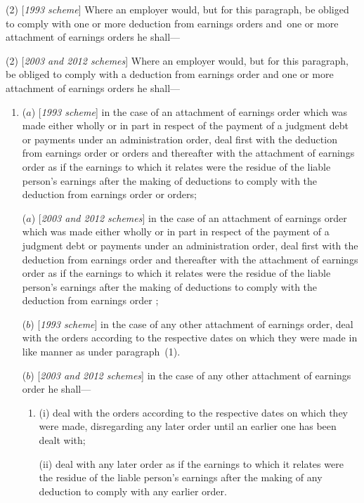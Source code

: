 \documentclass[12pt,a4paper]{article}
\begin{document}
(2) [\emph{1993 scheme}] Where an employer would, but for this paragraph, be obliged to comply with one or more deduction from earnings orders and~one or more attachment of earnings orders he shall—

(2) [\emph{2003 and 2012 schemes}] Where an employer would, but for this paragraph, be obliged to comply with 
a deduction from earnings order  %
and one or more attachment of earnings orders he shall—
\begin{enumerate}\item[]
($a$) [\emph{1993 scheme}] in the case of an attachment of earnings order which was made either wholly or in part in respect of the payment of a judgment debt or payments under an administration order, deal first with the deduction from earnings order or orders and thereafter with the attachment of earnings order as if the earnings to which it relates were the residue of the liable person’s earnings after the making of deductions to comply with the deduction from earnings order or orders;

($a$) [\emph{2003 and 2012 schemes}] in the case of an attachment of earnings order which was made either wholly or in part in respect of the payment of a judgment debt or payments under an administration order, deal first with the deduction from earnings order
and thereafter with the attachment of earnings order as if the earnings to which it relates were the residue of the liable person’s earnings after the making of deductions to comply with the deduction from earnings order%
;

($b$) [\emph{1993 scheme}] in the case of any other attachment of earnings order, deal with the orders according to the respective dates on which they were made in like manner as under paragraph~(1).

($b$) [\emph{2003 and 2012 schemes}] in the case of any other attachment of earnings order
he shall—
\begin{enumerate}\item[]
(i) deal with the orders according to the respective dates on which they were made, disregarding any later order until an earlier one has been dealt with;

(ii) deal with any later order as if the earnings to which it relates were the residue of the liable person’s earnings after the making of any deduction to comply with any earlier order.
\end{enumerate}  %
\end{enumerate}
\end{document}
